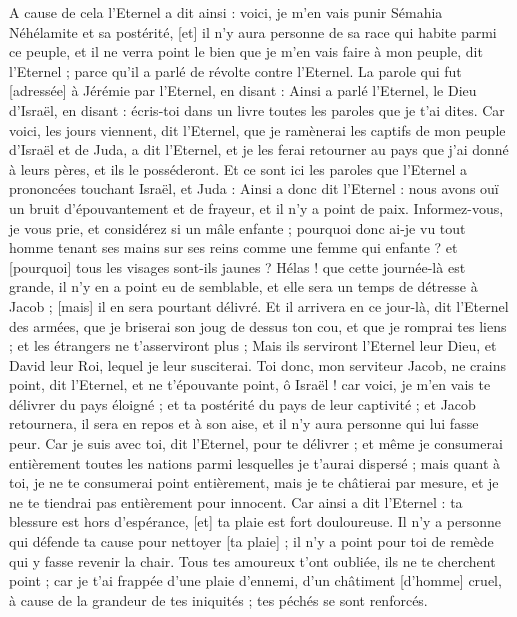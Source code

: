 \begin{multicols}{2}
A cause de cela l'Eternel a dit ainsi : voici, je m'en vais punir Sémahia Néhélamite et sa postérité, [et] il n'y aura personne de sa race qui habite parmi ce peuple, et il ne verra point le bien que je m'en vais faire à mon peuple, dit l'Eternel ; parce qu'il a parlé de révolte contre l'Eternel.
\VerseOne{}La parole qui fut [adressée] à Jérémie par l'Eternel, en disant :
Ainsi a parlé l'Eternel, le Dieu d'Israël, en disant : écris-toi dans un livre toutes les paroles que je t'ai dites.
Car voici, les jours viennent, dit l'Eternel, que je ramènerai les captifs de mon peuple d'Israël et de Juda, a dit l'Eternel, et je les ferai retourner au pays que j'ai donné à leurs pères, et ils le posséderont.
Et ce sont ici les paroles que l'Eternel a prononcées touchant Israël, et Juda :
Ainsi a donc dit l'Eternel : nous avons ouï un bruit d'épouvantement et de frayeur, et il n'y a point de paix.
Informez-vous, je vous prie, et considérez si un mâle enfante ; pourquoi donc ai-je vu tout homme tenant ses mains sur ses reins comme une femme qui enfante ? et [pourquoi] tous les visages sont-ils jaunes ?
Hélas ! que cette journée-là est grande, il n'y en a point eu de semblable, et elle sera un temps de détresse à Jacob ; [mais] il en sera pourtant délivré.
Et il arrivera en ce jour-là, dit l'Eternel des armées, que je briserai son joug de dessus ton cou, et que je romprai tes liens ; et les étrangers ne t'asserviront plus ;
Mais ils serviront l'Eternel leur Dieu, et David leur Roi, lequel je leur susciterai.
Toi donc, mon serviteur Jacob, ne crains point, dit l'Eternel, et ne t'épouvante point, ô Israël ! car voici, je m'en vais te délivrer du pays éloigné ; et ta postérité du pays de leur captivité ; et Jacob retournera, il sera en repos et à son aise, et il n'y aura personne qui lui fasse peur.
Car je suis avec toi, dit l'Eternel, pour te délivrer ; et même je consumerai entièrement toutes les nations parmi lesquelles je t'aurai dispersé ; mais quant à toi, je ne te consumerai point entièrement, mais je te châtierai par mesure, et je ne te tiendrai pas entièrement pour innocent.
Car ainsi a dit l'Eternel : ta blessure est hors d'espérance, [et] ta plaie est fort douloureuse.
Il n'y a personne qui défende ta cause pour nettoyer [ta plaie] ; il n'y a point pour toi de remède qui y fasse revenir la chair.
Tous tes amoureux t'ont oubliée, ils ne te cherchent point ; car je t'ai frappée d'une plaie d'ennemi, d'un châtiment [d'homme] cruel, à cause de la grandeur de tes iniquités ; tes péchés se sont renforcés.

\end{multicols}
